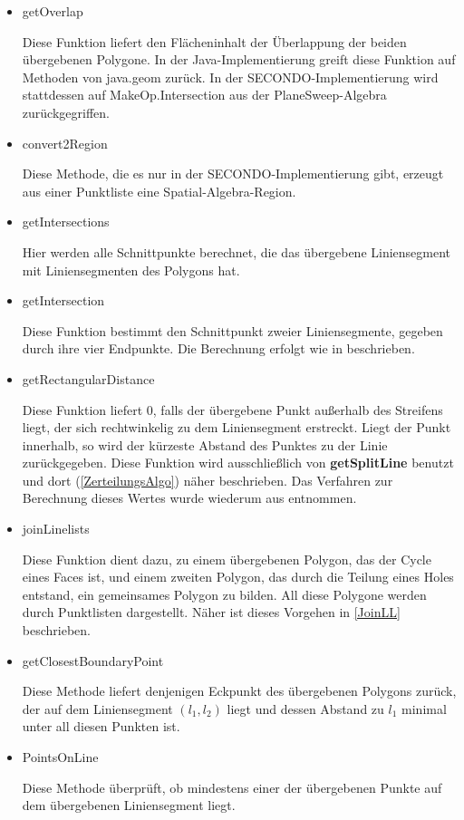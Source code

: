 \begin{itemize}
\item getOverlap

Diese Funktion liefert den Flächeninhalt der Überlappung der beiden übergebenen Polygone. In der Java-Implementierung greift diese Funktion auf Methoden von java.geom zurück. In der SECONDO-Implementierung wird stattdessen auf MakeOp.Intersection aus der PlaneSweep-Algebra zurückgegriffen.

\item convert2Region

Diese Methode, die es nur in der SECONDO-Implementierung gibt, erzeugt aus einer Punktliste eine Spatial-Algebra-Region.

\item getIntersections

Hier werden alle Schnittpunkte berechnet, die das übergebene Liniensegment mit Liniensegmenten des Polygons hat. 

\item getIntersection

Diese Funktion bestimmt den Schnittpunkt zweier Liniensegmente, gegeben durch ihre vier Endpunkte. Die Berechnung erfolgt wie in \cite{BW} beschrieben.

\item getRectangularDistance

Diese Funktion liefert 0, falls der übergebene Punkt außerhalb des Streifens liegt, der sich rechtwinkelig zu dem Liniensegment erstreckt. Liegt der Punkt innerhalb, so wird der kürzeste Abstand des Punktes zu der Linie zurückgegeben. Diese Funktion wird ausschließlich von \textbf{getSplitLine} benutzt und dort (\vref{ZerteilungsAlgo}) näher beschrieben. Das Verfahren zur Berechnung dieses Wertes wurde wiederum aus \cite{BW} entnommen.

\item joinLinelists

Diese Funktion dient dazu, zu einem übergebenen Polygon, das der Cycle eines Faces ist, und einem zweiten Polygon, das durch die Teilung eines Holes entstand, ein gemeinsames Polygon zu bilden. All diese  Polygone werden durch Punktlisten dargestellt. Näher ist dieses Vorgehen in \vref{JoinLL} beschrieben.

\item getClosestBoundaryPoint

Diese Methode liefert denjenigen Eckpunkt des übergebenen Polygons zurück, der auf dem Liniensegment $(l_1,l_2)$ liegt und dessen Abstand zu $l_1$ minimal unter all diesen Punkten ist.

\item PointsOnLine

Diese Methode überprüft, ob mindestens einer der übergebenen Punkte auf dem übergebenen Liniensegment liegt.

\end{itemize}



